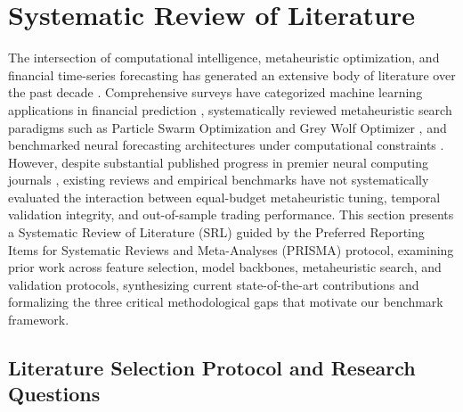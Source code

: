 
\section{Systematic Review of Literature}\label{sec:literature_review}

The intersection of computational intelligence, metaheuristic optimization, and financial time-series forecasting has generated an extensive body of literature over the past decade \cite{henrique2019stock_review, rajwar2023exhaustive_review, jiang2021applications}. Comprehensive surveys have categorized machine learning applications in financial prediction \cite{henrique2019stock_review, jiang2021applications}, systematically reviewed metaheuristic search paradigms such as Particle Swarm Optimization \cite{gad2022pso_comprehensive, wang2018pso_comprehensive} and Grey Wolf Optimizer \cite{faris2018gwo_review}, and benchmarked neural forecasting architectures under computational constraints \cite{dhingra2025solar, jovanovic2024wann}. However, despite substantial published progress in premier neural computing journals \cite{billah2024nca_moving_average, bandgar2025finchronos, al_bannoud2026accelerating, bashir2026evobagnet}, existing reviews and empirical benchmarks have not systematically evaluated the interaction between equal-budget metaheuristic tuning, temporal validation integrity, and out-of-sample trading performance. This section presents a Systematic Review of Literature (SRL) guided by the Preferred Reporting Items for Systematic Reviews and Meta-Analyses (PRISMA) protocol, examining prior work across feature selection, model backbones, metaheuristic search, and validation protocols, synthesizing current state-of-the-art contributions and formalizing the three critical methodological gaps that motivate our benchmark framework.

\subsection{Literature Selection Protocol and Research Questions}\label{subsec:selection_protocol}

